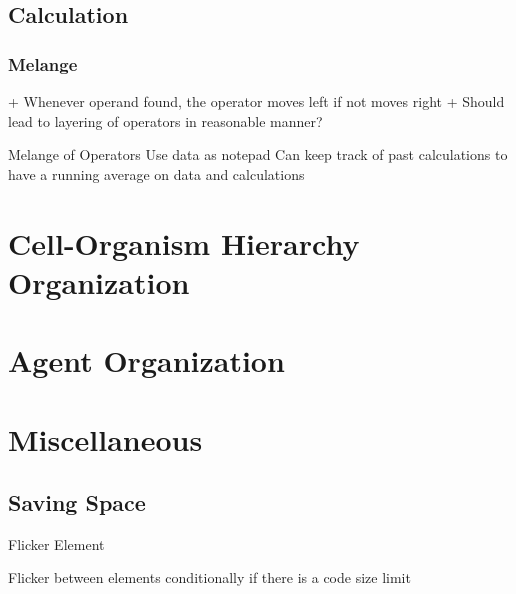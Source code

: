 \documentclass[article]{memoir}
\begin{document}
\section{Calculation}


\subsection{Melange}

+ Whenever operand found, the operator moves left if not moves right
+ Should lead to layering of operators in reasonable manner?

Melange of Operators Use data as notepad
Can keep track of past calculations to have a running average on data and calculations


\chapter{Cell-Organism Hierarchy Organization}



\chapter{Agent Organization}


\chapter{Miscellaneous}

\section{Saving Space}


Flicker Element

Flicker between elements conditionally if there is a code size limit
\end{document}
